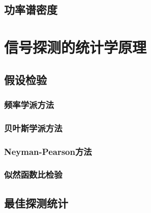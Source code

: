 \subsection{功率谱密度}

\section{信号探测的统计学原理}
\subsection{假设检验}
\subsubsection{频率学派方法}
\subsubsection{贝叶斯学派方法}
\subsubsection{Neyman-Pearson方法}
\subsubsection{似然函数比检验}
\subsection{最佳探测统计}
